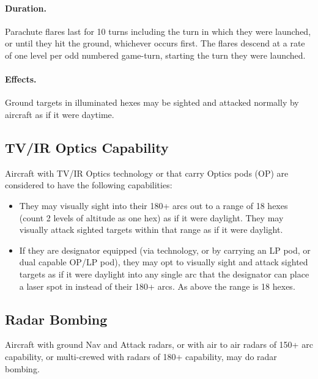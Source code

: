 \begin{advancedrules}
\paragraph{Duration.} Parachute flares last for 10 turns including the turn in which they were launched, or until they hit the ground, whichever occurs first. The flares descend at a rate of one level per odd numbered game-turn, starting the turn they were launched.

\paragraph{Effects.} Ground targets in illuminated hexes may be sighted and attacked normally by aircraft as if it were daytime.

\subsection{TV/IR Optics Capability}

Aircraft with TV/IR Optics technology or that carry Optics pods (OP) are considered to have the following capabilities:

\begin{itemize}

    \item They may visually sight into their 180+ arcs out to a range of 18 hexes (count 2 levels of altitude as one hex) as if it were daylight. They may visually attack sighted targets within that range as if it were daylight. 

    \item If they are designator equipped (via technology, or by carrying an LP pod, or dual capable OP/LP pod), they may opt to visually sight and attack sighted targets as if it were daylight into any single arc that the designator can place a laser spot in instead of their 180+ arcs. As above the range is 18 hexes.

\end{itemize}

\subsection{Radar Bombing}

Aircraft with ground Nav and Attack radars, or with air to air radars of 150+ arc capability, or multi-crewed with radars of 180+ capability, may do radar bombing.


\end{advancedrules}
